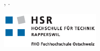 
\begin{titlepage}

\begin{addmargin}[-1cm]{-3cm}
\begin{center}
\large

\hfill
\vfill

\begingroup
\color{Maroon}{\LARGE\spacedallcaps{\myTitle}}\\ \bigskip %
\endgroup

\spacedlowsmallcaps{\myName} %

\vfill


\mySubtitle \\ %
\myThesis, \myTime. \\

\vspace{2cm}

\includegraphics[width=5cm]{images/HSR_Logo_CMYK.eps} \medskip


\end{center}
\end{addmargin}

\end{titlepage}
